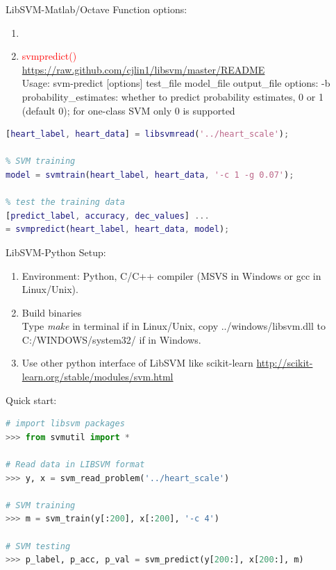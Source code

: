 \documentclass[compress,blue]{beamer}
\begin{document}
\begin{frame}{LibSVM-Matlab/Octave}
	Function options:
	\begin{enumerate}
		\item<0>\vspace{-0.25in}
		\item \textcolor{red}{svmpredict()} \\
		\url{https://raw.github.com/cjlin1/libsvm/master/README}\\
			Usage: svm-predict [options] test\_file model\_file output\_file
options:
-b probability\_estimates: whether to predict probability estimates, 0 or 1 (default 0); for one-class SVM only 0 is supported
	\end{enumerate}
\end{frame}

\begin{frame}[fragile]
\scriptsize
\begin{lstlisting}[language=Matlab]
% read provided data heart\_scale
[heart_label, heart_data] = libsvmread('../heart_scale');

% SVM training 
model = svmtrain(heart_label, heart_data, '-c 1 -g 0.07');

% test the training data
[predict_label, accuracy, dec_values] ...
= svmpredict(heart_label, heart_data, model); 
\end{lstlisting}
\normalsize
\end{frame}

\begin{frame}{LibSVM-Python}
	Setup:
	\begin{enumerate}
	\item Environment: Python, C/C++ compiler (MSVS in Windows or gcc in Linux/Unix).
	\item Build binaries\\
		Type \textit{make} in terminal if in Linux/Unix, copy ../windows/libsvm.dll to C:/WINDOWS/system32/ if in Windows.
	\item Use other python interface of LibSVM like scikit-learn \url{http://scikit-learn.org/stable/modules/svm.html}
	\end{enumerate}
\end{frame}

\begin{frame}[fragile]
Quick start: 
\scriptsize
\begin{lstlisting}[language=Python]
# import libsvm packages 
>>> from svmutil import *

# Read data in LIBSVM format
>>> y, x = svm_read_problem('../heart_scale')

# SVM training
>>> m = svm_train(y[:200], x[:200], '-c 4')

# SVM testing
>>> p_label, p_acc, p_val = svm_predict(y[200:], x[200:], m)
\end{lstlisting}
\normalsize
\end{frame}
\end{document}
